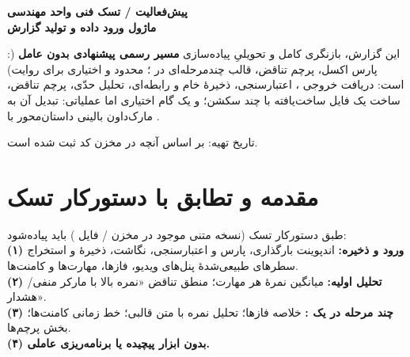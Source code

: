 \documentclass[12pt,a4paper]{article}
\begin{document}
\begin{titlepage}
\thispagestyle{empty}
\begin{center}
\vspace*{0.8cm}
{\Large\bfseries\color{deepblue}پیش‌فعالیت / تسک فنی واحد مهندسی}\\[0.3cm]
{\Huge\bfseries\color{mainblue}ماژول ورود داده و تولید گزارش}\\[0.35cm]
{\large {}}

\vspace{1cm}


\vfill

\begin{mybox}[colback=white,colframe=softgold]
\centering
این گزارش، بازنگری کامل و تحویلیِ پیاده‌سازی \textbf{مسیر رسمی پیشنهادی بدون عامل}%
(: پارس اکسل، پرچم تناقض، قالب چندمرحله‌ای در ؛  محدود و اختیاری برای روایت)
است: دریافت خروجی ، اعتبارسنجی، ذخیرهٔ خام و رابطه‌ای، تحلیل حدّی، پرچم تناقض، ساخت یک فایل  ساخت‌یافته با چند سکشن؛ و یک گام اختیاری اما عملیاتی: تبدیل آن  به مارک‌داون بالینی داستان‌محور با .
\end{mybox}

\vfill
{\large تاریخ تهیه: \textcolor{deepblue}{} بر اساس آنچه در مخزن کد ثبت شده است.}
\vspace{0.5cm}

\end{center}
\end{titlepage}

\tableofcontents
\newpage

\section{مقدمه و تطابق با دستورکار تسک}
طبق دستورکار تسک (نسخه متنی موجود در مخزن / فایل ) باید پیاده‌شود:\\
\textbf{(۱) ورود و ذخیره:} اندپوینت بارگذاری، پارس و اعتبارسنجی، نگاشت، ذخیرهٔ  و استخراج سطرهای طبیعی‌شدهٔ پنل‌های ویدیو، فازها، مهارت‌ها و کامنت‌ها.\\
\textbf{(۲) تحلیل اولیه:} میانگین نمرهٔ هر مهارت؛ منطق تناقض «نمره بالا با مارکر منفی/هشدار».\\
\textbf{(۳) چند مرحله در یک :} خلاصه فازها؛ تحلیل نمره با متن قالبی؛ خط زمانی کامنت‌ها؛ بخش پرچم‌ها.\\
\textbf{(۴) بدون ابزار پیچیده یا برنامه‌ریزی عاملی.}
\end{document}
